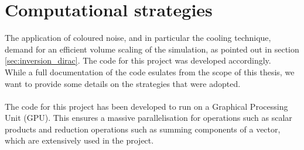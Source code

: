 \chapter{Computational strategies}
\label{chap:AppendixC}
The application of coloured noise, and in particular the cooling technique, demand for an efficient volume scaling of the simulation, as pointed out in section \ref{sec:inversion_dirac}. The code for this project was developed accordingly. \\
While a full documentation of the code esulates from the scope of this thesis, we want to provide some details on the strategies that were adopted. \\~\\
The code for this project has been developed to run on a Graphical Processing Unit (GPU). This ensures a massive parallelisation for operations such as scalar products and reduction operations such as summing components of a vector, which are extensively used in the project.
